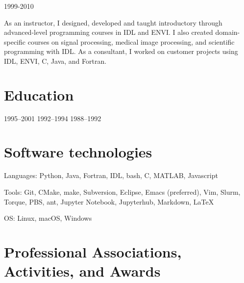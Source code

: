 \documentclass[letterpaper]{resume}
\begin{document}
            {1999-2010}
\begin{compactitem}[\itembullet]
  \item As an instructor, I designed, developed and taught
    introductory through advanced-level programming courses in IDL and
    ENVI. I also created domain-specific courses on signal processing,
    medical image processing, and scientific programming with IDL. As
    a consultant, I worked on customer projects using IDL, ENVI, C,
    Java, and Fortran.
\end{compactitem}


\section{Education}

            {1995--2001}
            {1992--1994}
            {1988--1992}


\section{Software technologies}

\vspace{0.5em}
\begin{compactitem}[\itembullet]
  \item Languages: Python, Java, Fortran, IDL, bash, C, MATLAB, Javascript
  \item Tools: Git, CMake, make, Subversion, Eclipse, Emacs
    (preferred), Vim, Slurm, Torque, PBS, ant, Jupyter Notebook,
    Jupyterhub, Markdown, \LaTeX
  \item OS: Linux, macOS, Windows
\end{compactitem}


\section{Professional Associations, Activities, and Awards}
\end{document}
